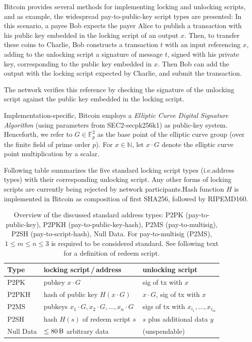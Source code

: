 \documentclass[a4paper,11pt,titlepage]{scrbook}
\begin{document}
Bitcoin provides several methods for implementing locking and unlocking scripts, and as example, the widespread pay-to-public-key script types are presented: In this scenario, a payee Bob expects the payer Alice to publish a transaction with his public key embedded in the locking script of an output $x$.
Then, to transfer these coins to Charlie, Bob constructs a transaction $t$ with an input referencing $x$, adding to the unlocking script a signature of message $t$, signed with his private key, corresponding to the public key embedded in $x$.
Then Bob can add the output with the locking script expected by Charlie, and submit the transaction.


The network verifies this reference by checking the signature of the unlocking script against the public key embedded in the locking script.


Implementation-specific, Bitcoin employs a \emph{Elliptic Curve Digital Signature Algorithm} (using parameters from SEC2-secpk256k1) as public-key system.
Henceforth, we refer to $G\in \mathbb{F}_p^2$ as the base point of the elliptic curve group (over the finite field of prime order $p$). For $x\in \mathbb{N}$, let $x\cdot G$ denote the elliptic curve point multiplication by a scalar.

Following table summarizes the five standard locking script types (i.e.\@ address types) with their corresponding unlocking script. Any other forms of locking scripts are currently being rejected by network participants.Hash function $H$ is implemented in Bitcoin as composition of first SHA256, followed by RIPEMD160.

\begin{table}
    \renewcommand{\arraystretch}{1.2}
    \centering
    \begin{tabular}{lll}
        \toprule
        \textbf{Type} & \textbf{locking script\,/\,address} & \textbf{unlocking script} \\
        \midrule
        P2PK & pubkey $x\cdot G$ & sig of tx with $x$ \\
        P2PKH & hash of public key $H(x\cdot G)$ & $x\cdot G$, sig of tx with $x$ \\
        P2MS & pubkeys $x_1{\cdot} G, x_2{\cdot} G, \dots, x_n{\cdot} G$ & sigs of tx with $x_{i_1}, \dots, x_{i_m}$ \\
        P2SH & hash $H(s)$ of redeem script $s$ & $s$ plus additional data $y$ \\
        Null Data & $\leq \SI{80}{\byte}$ arbitrary data & (unspendable)\\
        \bottomrule
    \end{tabular}
    \caption[Overview of the discussed standard address types]{Overview of the discussed standard address types: P2PK (pay-to-public-key), P2PKH (pay-to-public-key-hash), P2MS (pay-to-multisig), P2SH (pay-to-script-hash), Null Data. For pay-to-multisig (P2MS), $1\leq m\leq n\leq 3$ is required to be considered standard. See following text for a definition of redeem script.}
\end{table}
\end{document}
